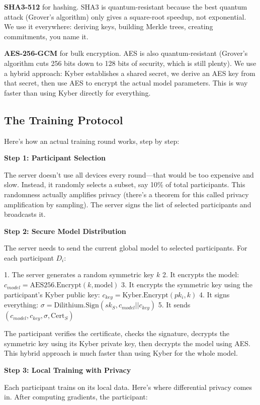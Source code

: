 \documentclass[onecolumn,11pt]{article}
\begin{document}
\textbf{SHA3-512} for hashing. SHA3 is quantum-resistant because the best quantum attack (Grover's algorithm) only gives a square-root speedup, not exponential. We use it everywhere: deriving keys, building Merkle trees, creating commitments, you name it.

\textbf{AES-256-GCM} for bulk encryption. AES is also quantum-resistant (Grover's algorithm cuts 256 bits down to 128 bits of security, which is still plenty). We use a hybrid approach: Kyber establishes a shared secret, we derive an AES key from that secret, then use AES to encrypt the actual model parameters. This is way faster than using Kyber directly for everything.

\subsection{The Training Protocol}

Here's how an actual training round works, step by step:

\textbf{Step 1: Participant Selection}

The server doesn't use all devices every round—that would be too expensive and slow. Instead, it randomly selects a subset, say 10\% of total participants. This randomness actually amplifies privacy (there's a theorem for this called privacy amplification by sampling). The server signs the list of selected participants and broadcasts it.

\textbf{Step 2: Secure Model Distribution}

The server needs to send the current global model to selected participants. For each participant $D_i$:

1. The server generates a random symmetric key $k$
2. It encrypts the model: $c_{model} = \text{AES256.Encrypt}(k, \text{model})$  
3. It encrypts the symmetric key using the participant's Kyber public key: $c_{key} = \text{Kyber.Encrypt}(pk_i, k)$
4. It signs everything: $\sigma = \text{Dilithium.Sign}(sk_S, c_{model} || c_{key})$
5. It sends $(c_{model}, c_{key}, \sigma, \text{Cert}_S)$

The participant verifies the certificate, checks the signature, decrypts the symmetric key using its Kyber private key, then decrypts the model using AES. This hybrid approach is much faster than using Kyber for the whole model.

\textbf{Step 3: Local Training with Privacy}

Each participant trains on its local data. Here's where differential privacy comes in. After computing gradients, the participant:
\end{document}
